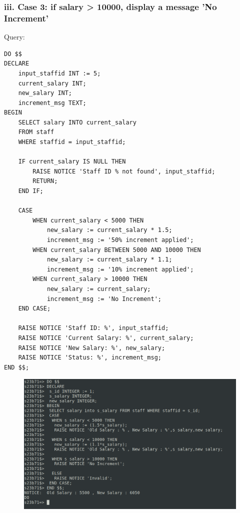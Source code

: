 \documentclass{article}
\begin{document}
\subsubsection*{iii. Case 3: if salary > 10000, display a message 'No Increment'}
Query:
\begin{Verbatim}[frame=single,framerule=1pt,fontfamily=courier,fontsize=\small]
DO $$
DECLARE
    input_staffid INT := 5;
    current_salary INT;
    new_salary INT;
    increment_msg TEXT;
BEGIN
    SELECT salary INTO current_salary 
    FROM staff 
    WHERE staffid = input_staffid;
    
    IF current_salary IS NULL THEN
        RAISE NOTICE 'Staff ID % not found', input_staffid;
        RETURN;
    END IF;
    
    CASE
        WHEN current_salary < 5000 THEN
            new_salary := current_salary * 1.5;
            increment_msg := '50% increment applied';
        WHEN current_salary BETWEEN 5000 AND 10000 THEN
            new_salary := current_salary * 1.1;
            increment_msg := '10% increment applied';
        WHEN current_salary > 10000 THEN
            new_salary := current_salary;
            increment_msg := 'No Increment';
    END CASE;
    
    RAISE NOTICE 'Staff ID: %', input_staffid;
    RAISE NOTICE 'Current Salary: %', current_salary;
    RAISE NOTICE 'New Salary: %', new_salary;
    RAISE NOTICE 'Status: %', increment_msg;
END $$;
\end{Verbatim}
\begin{figure}[H]
    \centering
    \includegraphics[width=\textwidth]{cycle5/5_3_b.png}
\end{figure}
\end{document}

